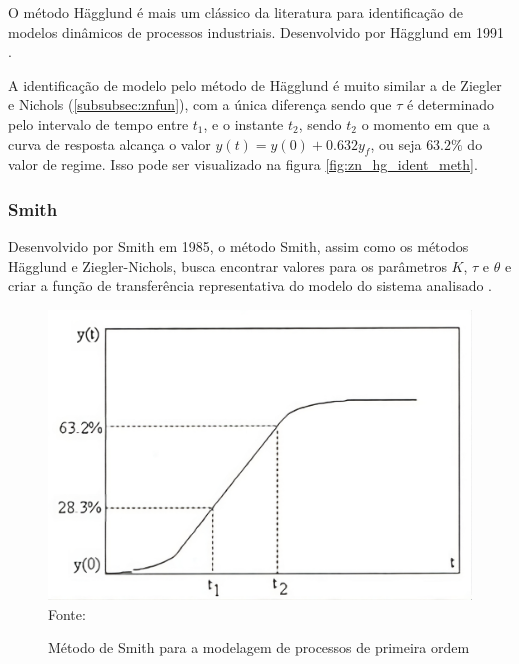 O método Hägglund é mais um clássico da literatura para identificação de modelos dinâmicos de
processos industriais.
Desenvolvido por Hägglund em 1991 \cite{CoelhoIdentificacao}.

A identificação de modelo pelo método de Hägglund é muito similar a de Ziegler e Nichols (\ref{subsubsec:znfun}), com a
única diferença sendo que $\tau$ é determinado pelo intervalo de tempo entre $t_1$, e o instante $t_2$, sendo $t_2$
o momento em que a curva de resposta alcança o valor $y(t) = y(0) + 0.632y_f$, ou seja $63.2\%$ do valor de regime.
Isso pode ser visualizado na figura \ref{fig:zn_hg_ident_meth}.

\subsubsection{Smith}\label{subsubsec:smfun}

Desenvolvido por Smith em 1985, o método Smith, assim como os métodos Hägglund e Ziegler-Nichols, busca encontrar
valores para os parâmetros $K$, $\tau$ e $\theta$ e criar a função de transferência representativa do modelo do sistema
analisado \cite{CoelhoIdentificacao}.

\begin{figure}[H]
    \centering
    \caption{Método de Smith para a modelagem de processos de primeira ordem}
    \includegraphics[scale=0.3]{figuras/sm_ident_meth}
    \label{fig:sm_ident_meth}
    \\
    \vspace{0cm}\hspace{0cm}\small{Fonte: \cite{CoelhoIdentificacao}}
\end{figure}

